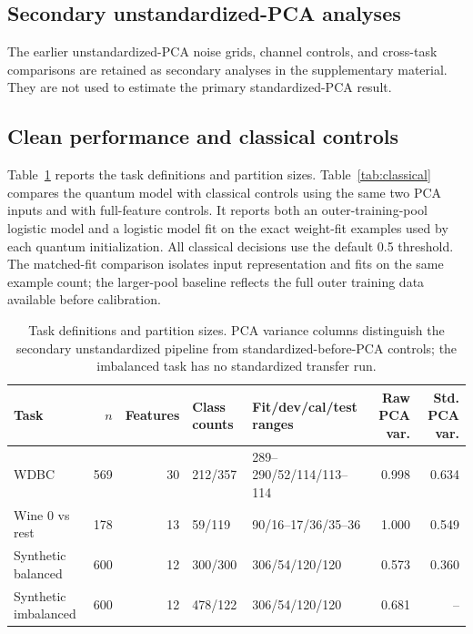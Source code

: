 \documentclass[conference]{IEEEtran}
\begin{document}
\subsection{Secondary unstandardized-PCA analyses}
The earlier unstandardized-PCA noise grids, channel controls, and cross-task comparisons are retained as secondary analyses in the supplementary material. They are not used to estimate the primary standardized-PCA result.

\subsection{Clean performance and classical controls}
Table~\ref{tab:datasets} reports the task definitions and partition sizes. Table~\ref{tab:classical} compares the quantum model with classical controls using the same two PCA inputs and with full-feature controls. It reports both an outer-training-pool logistic model and a logistic model fit on the exact weight-fit examples used by each quantum initialization. All classical decisions use the default 0.5 threshold. The matched-fit comparison isolates input representation and fits on the same example count; the larger-pool baseline reflects the full outer training data available before calibration.
\begin{table}[t]\centering\scriptsize
\caption{Task definitions and partition sizes. PCA variance columns distinguish the secondary unstandardized pipeline from standardized-before-PCA controls; the imbalanced task has no standardized transfer run.}
\label{tab:datasets}
\begin{tabular}{@{}l r r l l r r@{}}\toprule
Task & $n$ & Features & Class counts & Fit/dev/cal/test ranges & Raw PCA var. & Std. PCA var. \\
\midrule
WDBC & 569 & 30 & 212/357 & 289--290/52/114/113--114 & 0.998 & 0.634 \\
Wine 0 vs rest & 178 & 13 & 59/119 & 90/16--17/36/35--36 & 1.000 & 0.549 \\
Synthetic balanced & 600 & 12 & 300/300 & 306/54/120/120 & 0.573 & 0.360 \\
Synthetic imbalanced & 600 & 12 & 478/122 & 306/54/120/120 & 0.681 & -- \\
\bottomrule\end{tabular}\end{table}
\end{document}
